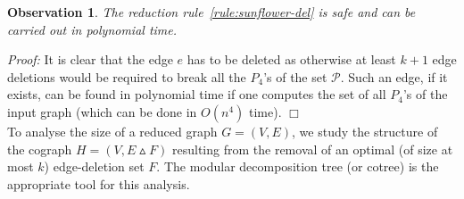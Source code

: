 \documentclass[11pt]{article}
\newenvironment{proof}{\noindent\textit{Proof: }}{{\hfill $\Box$}}
\newtheorem{observation}[lemma]{Observation}
\begin{document}
\begin{observation} \label{obs:rule-del}
The reduction rule~\ref{rule:sunflower-del} is safe and can be carried out in polynomial time.
\end{observation}

\begin{proof}
It is clear that the edge $e$ has to be deleted as otherwise at least $k+1$ edge deletions would be required to break all the $P_4$'s of the set $\mathcal{P}$. Such an edge, if it exists, can be found in polynomial time if one computes the set of all $P_4$'s of the input graph (which can be done in $O(n^4)$ time).
\end{proof}\\

To analyse the size of a reduced graph $G=(V,E)$, we study the structure of the cograph $H=(V,E\vartriangle F)$ resulting from the removal of an optimal (of size at most $k$) edge-deletion set $F$. The modular decomposition tree (or cotree) is the appropriate tool for this analysis.

\newpage 
\end{document}
